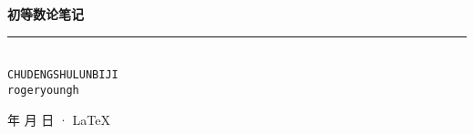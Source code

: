 \documentclass[cn,11pt,blue,pad,founder]{elegantbook}
\begin{document}
\newcommand\mfrac[2]{\dfrac{#1\smash[b]{\strut}}{#2\smash[t]{\strut}}}
\newcommand\RR{\mathbb{R}}
\newcommand\NN{\mathbb{N}}
\newcommand\QQ{\mathbb{Q}}
\newcommand\ee{\mathrm{e}}
\newcommand\dd{\mathrm{d}}
\newcommand\uppi{\mathrm{\pi}}
\newcommand\num[1]{{\textit{（}}{\rm{#1}}{\textit{）}}}

\begin{titlepage}
    \vspace*{25ex}%
    \begin{minipage}{.9\textwidth}
    \flushright
        {\textbf{初等数论笔记}}\\%
        \rule{\linewidth}{1pt}\\ \vspace{2ex}
        {\texttt{CHUDENGSHULUNBIJI}} \\%
        \vspace{20ex}%
        {\texttt{rogeryoungh}}%
    \end{minipage}
    \vfill\centering
    {\number\year 年 \number\month 月 \number\day 日 · \LaTeX{}}
\end{titlepage}
\clearpage{\hypersetup{hidelinks}\tableofcontents}

\clearpage

\end{document}
